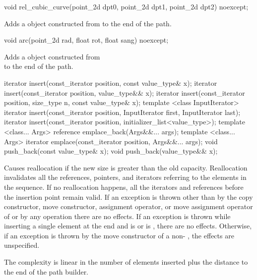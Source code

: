 %
\begin{itemdecl}
void rel_cubic_curve(point_2d dpt0, point_2d dpt1,
  point_2d dpt2) noexcept;
\end{itemdecl}
\begin{itemdescr}
\pnum
\effects
Adds a  object constructed from  to the end of the path.
\end{itemdescr}

%
\begin{itemdecl}
void arc(point_2d rad, float rot, float sang) noexcept;
\end{itemdecl}
\begin{itemdescr}
\pnum
\effects
Adds a  object constructed from \\  to the end of the path.
\end{itemdescr}

%
%
%
\begin{itemdecl}
iterator insert(const_iterator position, const value_type& x);
iterator insert(const_iterator position, value_type&& x);
iterator insert(const_iterator position, size_type n, const value_type& x);
template <class InputIterator>
iterator insert(const_iterator position, InputIterator first,
  InputIterator last);
iterator insert(const_iterator position, initializer_list<value_type>);
template <class... Args>
reference emplace_back(Args&&... args);
template <class... Args>
iterator emplace(const_iterator position, Args&&... args);
void push_back(const value_type& x);
void push_back(value_type&& x);
\end{itemdecl}

\begin{itemdescr}
\pnum
\remarks
Causes reallocation if the new size is greater than the old capacity.
Reallocation invalidates all the references, pointers, and iterators
referring to the elements in the sequence.
If no reallocation happens, all the iterators and references before the insertion point remain valid.
If an exception is thrown other than by
the copy constructor, move constructor,
assignment operator, or move assignment operator of
 or by any  operation
there are no effects.
If an exception is thrown while inserting a single element at the end and
 is  or 
is , there are no effects.
Otherwise, if an exception is thrown by the move constructor of a non-
, the effects are unspecified.

\pnum
\complexity
The complexity is linear in the number of elements inserted plus the 
distance to the end of the path builder.
\end{itemdescr}

